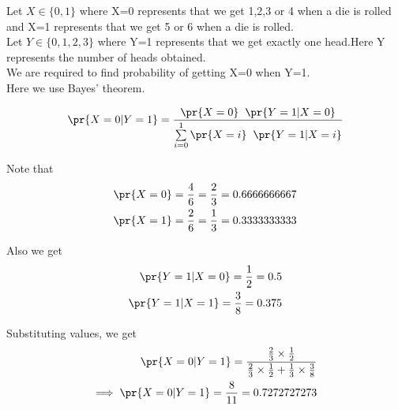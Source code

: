 Let $X\in\{0,1\}$ where X=0 represents that we get 1,2,3 or 4 when a die is rolled and X=1 represents that we get 5 or 6 when a die is rolled. \\
Let $Y\in\{0,1,2,3\}$ where Y=1 represents that we get exactly one head.Here Y represents the number of heads obtained. \\ 

We are required to find probability of getting X=0 when Y=1.\\
Here we use Bayes' theorem.

\begin{equation}
   \pr{X=0|Y=1}= \frac{\pr{X=0} \hspace{0.2cm} \pr{Y=1|X=0}}{\sum\limits_{i=0}^{1} \pr{X=i} \hspace{0.2cm} \pr{Y=1|X=i}}
\end{equation} 

Note that 
\begin{align}
    \pr{X=0} = \frac{4}{6} = \frac{2}{3} = 0.6666666667 \\
    \pr{X=1} = \frac{2}{6} = \frac{1}{3} = 0.3333333333
\end{align} 

Also we get
\begin{align}
    \pr{Y=1|X=0} = \frac{1}{2} = 0.5 \\
    \pr{Y=1|X=1} = \frac{3}{8} = 0.375
\end{align} 

Substituting values, we get
\begin{align}
    \pr{X=0|Y=1} = \frac{\frac{2}{3} \times \frac{1}{2}}{{\frac{2}{3} \times \frac{1}{2}} + \frac{1}{3} \times \frac{3}{8}} \\
\implies \pr{X=0|Y=1} = \frac{8}{11} = 0.7272727273
\end{align} 